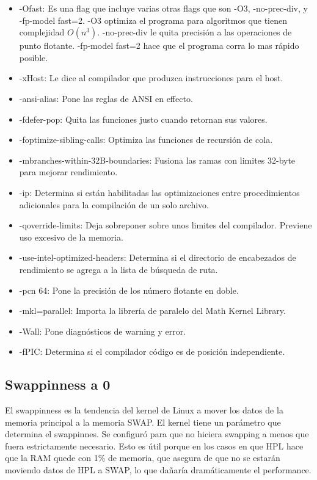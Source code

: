 \documentclass[conference,compsoc]{IEEEtran}
\begin{document}
\begin{itemize}
    \item -Ofast: Es una flag que incluye varias otras flags que son -O3, -no-prec-div, y -fp-model fast=2. -O3 optimiza el programa para algoritmos que tienen complejidad $ O(n^3)$. -no-prec-div le quita precisión a las operaciones de punto flotante. -fp-model fast=2 hace que el programa corra lo mas rápido posible.
    \item -xHost: Le dice al compilador que produzca instrucciones para el host.\cite{intel-xhost}
    \item -ansi-alias: Pone las reglas de ANSI en effecto.
    \item -fdefer-pop: Quita las funciones justo cuando retornan sus valores.
    \item -foptimize-sibling-calls: Optimiza las funciones de recursión de cola.
    \item -mbranches-within-32B-boundaries: Fusiona las ramas con limites 32-byte para mejorar rendimiento.
    \item -ip: Determina si están habilitadas las optimizaciones entre procedimientos adicionales para la compilación de un solo archivo.
    \item -qoverride-limits: Deja sobreponer sobre unos limites del compilador. Previene uso excesivo de la memoria.
    \item -use-intel-optimized-headers: Determina si el directorio de encabezados de rendimiento se agrega a la lista de búsqueda de ruta.
    \item -pcn 64: Pone la precisión de los número flotante en doble.
    \item -mkl=parallel: Importa la librería de paralelo del Math Kernel Library.
    \item -Wall: Pone diagnósticos de warning y error.
    \item -fPIC: Determina si el compilador código es de posición independiente.
\end{itemize}

\subsection{Swappinness a 0}
El swappinness es la tendencia del kernel de Linux a mover los datos de la memoria principal a la memoria SWAP. El kernel tiene un parámetro que determina el swappinnes. Se configuró para que no hiciera swapping a menos que fuera estrictamente necesario. Esto es útil porque en los casos en que HPL hace que la RAM quede con 1\% de memoria, que asegura de que no se estarán moviendo datos de HPL a SWAP, lo que dañaría dramáticamente el performance.
\end{document}
